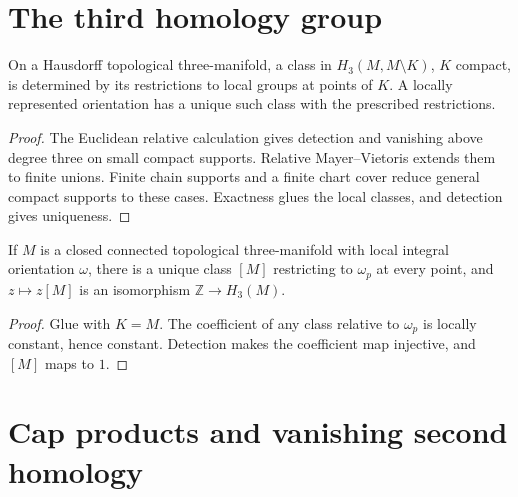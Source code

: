 \section{The third homology group}
\label{sec:foundations-top-homology}

\begin{lemma}
\label{lem:foundations-support-gluing}
On a Hausdorff topological three-manifold, a class in
$H_3(M,M\setminus K)$, $K$ compact, is determined by its restrictions
to local groups at points of $K$. A locally represented orientation
has a unique such class with the prescribed restrictions.
\end{lemma}
\begin{proof}
The Euclidean relative calculation gives detection and vanishing above
degree three on small compact supports. Relative Mayer--Vietoris extends
them to finite unions. Finite chain supports and a finite chart cover
reduce general compact supports to these cases. Exactness glues the local
classes, and detection gives uniqueness.
\end{proof}

\begin{proposition}
\label{prop:foundations-top-homology}
If $M$ is a closed connected topological three-manifold with local
integral orientation $\omega$, there is a unique class $[M]$ restricting
to $\omega_p$ at every point, and $z\mapsto z[M]$ is an isomorphism
$\mathbb Z\to H_3(M)$.
\end{proposition}
\begin{proof}
Glue with $K=M$. The coefficient of any class relative to $\omega_p$
is locally constant, hence constant. Detection makes the coefficient
map injective, and $[M]$ maps to $1$.
\end{proof}

\section{Cap products and vanishing second homology}
\label{sec:foundations-second-homology}

